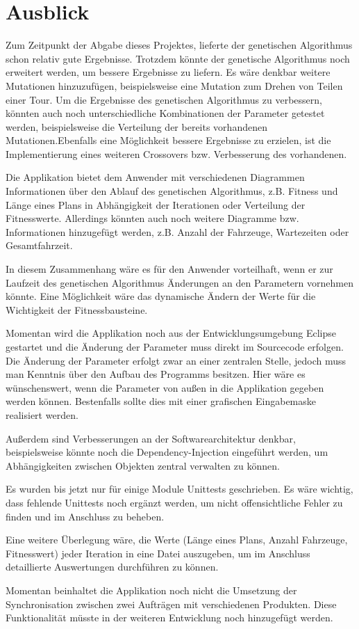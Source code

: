 \section{Ausblick}

Zum Zeitpunkt der Abgabe dieses Projektes, lieferte der genetischen Algorithmus schon relativ gute Ergebnisse. Trotzdem könnte der genetische Algorithmus noch erweitert werden, um bessere Ergebnisse zu liefern. Es wäre denkbar weitere Mutationen hinzuzufügen, beispielsweise eine Mutation zum Drehen von Teilen einer Tour. Um die Ergebnisse des genetischen Algorithmus zu verbessern, könnten auch noch unterschiedliche Kombinationen der Parameter getestet werden, beispielsweise die Verteilung der bereits vorhandenen Mutationen.Ebenfalls eine Möglichkeit bessere Ergebnisse zu erzielen, ist die Implementierung eines weiteren Crossovers bzw. Verbesserung des vorhandenen.

Die Applikation bietet dem Anwender mit verschiedenen Diagrammen Informationen über den Ablauf des genetischen Algorithmus, z.B. Fitness und Länge eines Plans in Abhängigkeit der Iterationen oder Verteilung der Fitnesswerte. Allerdings könnten auch noch weitere Diagramme bzw. Informationen hinzugefügt werden, z.B. Anzahl der Fahrzeuge, Wartezeiten oder Gesamtfahrzeit.

In diesem Zusammenhang wäre es für den Anwender vorteilhaft, wenn er zur Laufzeit des genetischen Algorithmus Änderungen an den Parametern vornehmen könnte. Eine Möglichkeit wäre das dynamische Ändern der Werte für die Wichtigkeit der Fitnessbausteine.

Momentan wird die Applikation noch aus der Entwicklungsumgebung Eclipse gestartet und die Änderung der Parameter muss direkt im Sourcecode erfolgen. Die Änderung der Parameter erfolgt zwar an einer zentralen Stelle, jedoch muss man Kenntnis über den Aufbau des Programms besitzen. Hier wäre es wünschenswert, wenn die Parameter von außen in die Applikation gegeben werden können. Bestenfalls sollte dies mit einer grafischen Eingabemaske realisiert werden.

Außerdem sind Verbesserungen an der Softwarearchitektur denkbar, beispielsweise könnte noch die Dependency-Injection eingeführt werden, um Abhängigkeiten zwischen Objekten zentral verwalten zu können.

Es wurden bis jetzt nur für einige Module Unittests geschrieben. Es wäre wichtig, dass fehlende Unittests noch ergänzt werden, um nicht offensichtliche Fehler zu finden und im Anschluss zu beheben.

Eine weitere Überlegung wäre, die Werte (Länge eines Plans, Anzahl Fahrzeuge, Fitnesswert) jeder Iteration in eine Datei auszugeben, um im Anschluss detaillierte Auswertungen durchführen zu können.

Momentan beinhaltet die Applikation noch nicht die Umsetzung der Synchronisation zwischen zwei Aufträgen mit verschiedenen Produkten. Diese Funktionalität müsste in der weiteren Entwicklung noch hinzugefügt werden.
